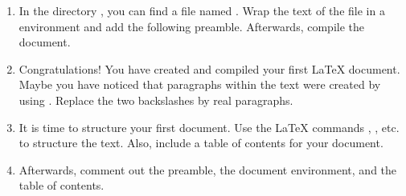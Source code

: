 \begin{enumerate}
	\item In the directory , you can find a file named . Wrap the text of the file in a  environment and add the following preamble. Afterwards, compile the document. 
	\item Congratulations! You have created and compiled your first \LaTeX{} 
	document. Maybe you have noticed that paragraphs within the text were 
	created by using . Replace the 
	two backslashes by real paragraphs.
	\item It is time to structure your first document. Use the \LaTeX{} 
	commands , 
	, etc. to structure the text. 
	Also, 
	include 
	a table of contents for your document. 
	\item Afterwards, comment out the preamble, the document environment, and the table of contents. 
\end{enumerate}


